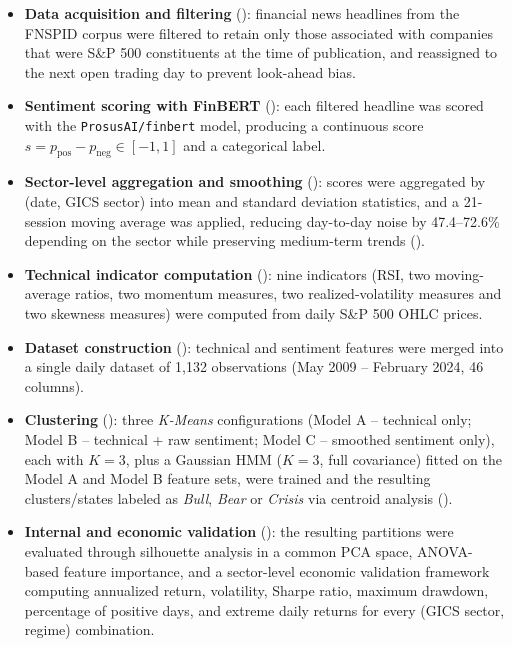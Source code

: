 \begin{itemize}
  \item \textbf{Data acquisition and filtering} ():
  financial news headlines from the FNSPID corpus were filtered to retain
  only those associated with companies that were S\&P 500 constituents at
  the time of publication, and reassigned to the next open trading day to
  prevent look-ahead bias.

  \item \textbf{Sentiment scoring with FinBERT} ():
  each filtered headline was scored with the \texttt{ProsusAI/finbert}
  model, producing a continuous score $s = p_{\text{pos}} - p_{\text{neg}}
  \in [-1,1]$ and a categorical label.

  \item \textbf{Sector-level aggregation and smoothing}
  (): scores were aggregated
  by (date, GICS sector) into mean and standard deviation statistics, and
  a 21-session moving average was applied, reducing day-to-day noise by
  47.4--72.6\% depending on the sector while preserving medium-term trends
  ().

  \item \textbf{Technical indicator computation}
  (): nine indicators (RSI, two moving-average
  ratios, two momentum measures, two realized-volatility measures and two
  skewness measures) were computed from daily S\&P 500 OHLC prices.

  \item \textbf{Dataset construction} (): technical
  and sentiment features were merged into a single daily dataset of 1,132
  observations (May 2009 -- February 2024, 46 columns).

  \item \textbf{Clustering} (): three
  \textit{K-Means} configurations (Model A -- technical only; Model B --
  technical + raw sentiment; Model C -- smoothed sentiment only), each
  with $K=3$, plus a Gaussian HMM ($K=3$, full covariance) fitted on the
  Model A and Model B feature sets, were trained and the resulting
  clusters/states labeled as \emph{Bull}, \emph{Bear} or \emph{Crisis}
  via centroid analysis ().

  \item \textbf{Internal and economic validation}
  (): the resulting partitions were
  evaluated through silhouette analysis in a common PCA space,
  ANOVA-based feature importance, and a sector-level economic validation
  framework computing annualized return, volatility, Sharpe ratio,
  maximum drawdown, percentage of positive days, and extreme daily returns
  for every (GICS sector, regime) combination.
\end{itemize}

